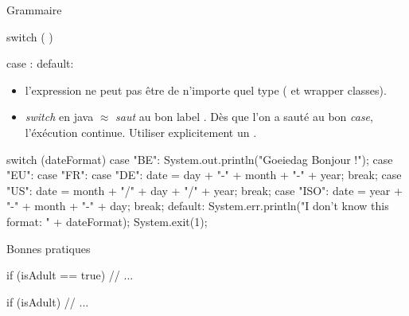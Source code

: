 \begin{hideedit}
\begin{frame}[fragile]{Grammaire}
\begin{grammaire}
    switch (  ) 


    case :
    default:
\end{grammaire}

  \begin{itemize}
    \item l'expression ne peut pas être de n'importe quel type ( et wrapper classes). 
    \item \textit{switch} en java \(\approx\) \og \textit{saut}
      au bon label \fg. Dès que l'on a sauté au bon
      \textit{case}, l'éxécution continue. Utiliser explicitement un
      .
  \end{itemize}
\end{frame}

\begin{frame}[fragile]
  \begin{java}
switch (dateFormat) {
    case "BE":
        System.out.println("Goeiedag Bonjour !");
    case "EU": case "FR": case "DE":
        date = day + "-" + month + "-" + year;
        break;
    case "US":
        date = month + "/" + day + "/" + year;
        break;
    case "ISO":
        date = year + "-" + month + "-" + day;
        break;
    default:
        System.err.println("I don't know this format: "
                + dateFormat);
        System.exit(1);
}
  \end{java}
\end{frame}


\begin{frame}[fragile]{Bonnes pratiques}

  \begin{wrong}
  \begin{java}
if (isAdult == true) {
    // ...
}
  \end{java}
  \end{wrong}

  \pause
  \begin{java}
if (isAdult) {
    // ...
}
  \end{java}
\end{frame}


\end{hideedit}
